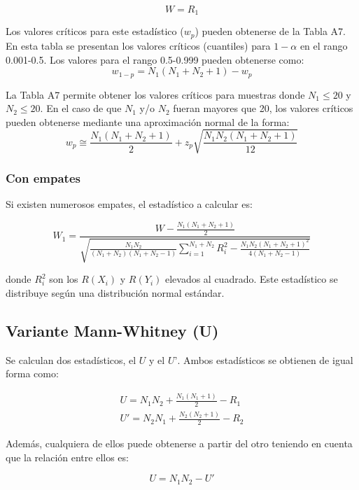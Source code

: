 \documentclass[]{book}
\theoremstyle{definition}
\theoremstyle{definition}
\theoremstyle{definition}
\theoremstyle{remark}
\begin{document}
\[W=R_1\]

Los valores críticos para este estadístico (\(w_p\)) pueden obtenerse de
la Tabla A7. En esta tabla se presentan los valores críticos (cuantiles)
para \(1-\alpha\) en el rango 0.001-0.5. Los valores para el rango
0.5-0.999 pueden obtenerse como: \[w_{1-p}=N_1 (N_1+N_2+1)-w_p\]

La Tabla A7 permite obtener los valores críticos para muestras donde
\(N_1\le20\) y \(N_2\le20\). En el caso de que \(N_1\) y/o \(N_2\)
fueran mayores que 20, los valores críticos pueden obtenerse mediante
una aproximación normal de la forma:
\[w_p\cong \frac{N_1 (N_1+N_2+1)}{2}+z_p \sqrt{\frac{N_1 N_2 (N_1+N_2+1)}{12}}\]

\hypertarget{w-con-empates}{%
\subsubsection{Con empates}\label{w-con-empates}}

Si existen numerosos empates, el estadístico a calcular es:

\[
W_1=\frac{W-\frac{N_1(N_1+N_2+1)}{2}}{\sqrt{\frac{N_1 N_2}{(N_1+N_2)(N_1+N_2-1)}\sum_{i=1}^{N_1+N_2}{R_i^2}-\frac{N_1 N_2 (N_1+N_2+1)^2}{4(N_1+N_2-1)}}}
\]

donde \(R_i^2\) son los \(R(X_i)\) y \(R(Y_i)\) elevados al cuadrado.
Este estadístico se distribuye según una distribución normal estándar.

\hypertarget{variante-mann-whitney-u}{%
\subsection{Variante Mann-Whitney (U)}\label{variante-mann-whitney-u}}

Se calculan dos estadísticos, el \(U\) y el \(U’\). Ambos estadísticos
se obtienen de igual forma como:

\[
\begin{matrix}
U = N_1 N_2+\frac{N_1 (N_1+1)}{2}-R_1 \\
U'=N_2 N_1+\frac{N_2 (N_2+1)}{2}-R_2
\end{matrix}
\]

Además, cualquiera de ellos puede obtenerse a partir del otro teniendo
en cuenta que la relación entre ellos es:

\[U=N_1 N_2-U'\]
\end{document}
